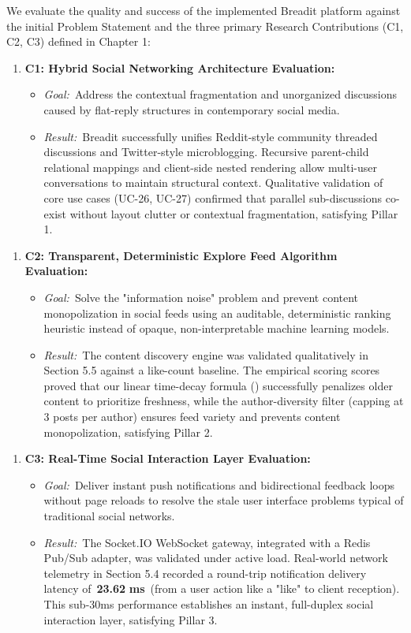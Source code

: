 We evaluate the quality and success of the implemented Breadit platform against the initial Problem Statement and the three primary Research Contributions (C1, C2, C3) defined in Chapter 1:
\begin{enumerate}
  \item \textbf{C1: Hybrid Social Networking Architecture Evaluation:}
\begin{itemize}
  \item \textit{Goal:}~Address the contextual fragmentation and unorganized discussions caused by flat-reply structures in contemporary social media.
  \item \textit{Result:}~Breadit successfully unifies Reddit-style community threaded discussions and Twitter-style microblogging. Recursive parent-child relational mappings and client-side nested rendering allow multi-user conversations to maintain structural context. Qualitative validation of core use cases (UC-26, UC-27) confirmed that parallel sub-discussions co-exist without layout clutter or contextual fragmentation, satisfying Pillar 1.
\end{itemize}
\end{enumerate}
\begin{enumerate}
  \item \textbf{C2: Transparent, Deterministic Explore Feed Algorithm Evaluation:}
\begin{itemize}
  \item \textit{Goal:}~Solve the "information noise" problem and prevent content monopolization in social feeds using an auditable, deterministic ranking heuristic instead of opaque, non-interpretable machine learning models.
  \item \textit{Result:}~The content discovery engine was validated qualitatively in Section 5.5 against a like-count baseline. The empirical scoring scores proved that our linear time-decay formula () successfully penalizes older content to prioritize freshness, while the author-diversity filter (capping at 3 posts per author) ensures feed variety and prevents content monopolization, satisfying Pillar 2.
\end{itemize}
\end{enumerate}
\begin{enumerate}
  \item \textbf{C3: Real-Time Social Interaction Layer Evaluation:}
\begin{itemize}
  \item \textit{Goal:}~Deliver instant push notifications and bidirectional feedback loops without page reloads to resolve the stale user interface problems typical of traditional social networks.
  \item \textit{Result:}~The Socket.IO WebSocket gateway, integrated with a Redis Pub/Sub adapter, was validated under active load. Real-world network telemetry in Section 5.4 recorded a round-trip notification delivery latency of~\textbf{23.62 }\textbf{ms}~(from a user action like a "like" to client reception). This sub-30ms performance establishes an instant, full-duplex social interaction layer, satisfying Pillar 3.
\end{itemize}
\end{enumerate}
